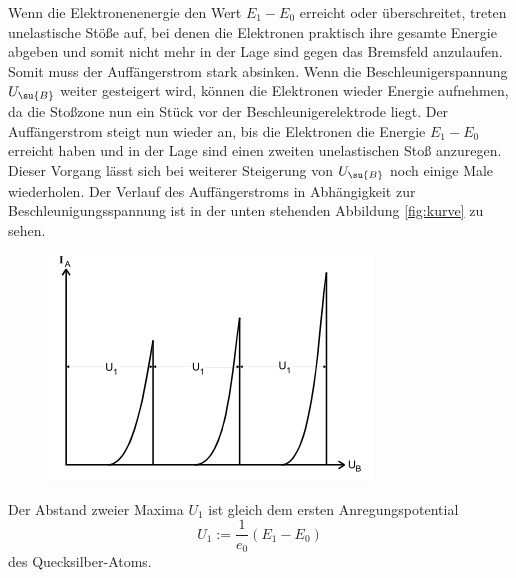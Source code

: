 Wenn die Elektronenenergie den Wert $E_1-E_0$ erreicht oder überschreitet, treten
unelastische Stöße auf, bei denen die Elektronen praktisch ihre gesamte Energie
abgeben und somit nicht mehr in der Lage sind gegen das Bremsfeld anzulaufen.
Somit muss der Auffängerstrom stark absinken.
Wenn die Beschleunigerspannung $U_\su{B}$ weiter gesteigert wird, können die
Elektronen wieder Energie aufnehmen, da die Stoßzone nun ein Stück vor der
Beschleunigerelektrode liegt.
Der Auffängerstrom steigt nun wieder an, bis die Elektronen die Energie $E_1-E_0$
erreicht haben und in der Lage sind einen zweiten unelastischen Stoß anzuregen.
Dieser Vorgang lässt sich bei weiterer Steigerung von $U_\su{B}$ noch einige
Male wiederholen. Der Verlauf des Auffängerstroms in Abhängigkeit zur
Beschleunigungsspannung ist in der unten stehenden Abbildung \ref{fig:kurve} zu
sehen.
\begin{figure}
  \includegraphics{bilder/kurve.pdf}
  \caption{}
  \label{}
\end{figure}
Der Abstand zweier Maxima $U_1$ ist gleich dem ersten Anregungspotential
\begin{equation*}
  U_1:=\frac{1}{e_0}(E_1-E_0)
\end{equation*}
des Quecksilber-Atoms.

